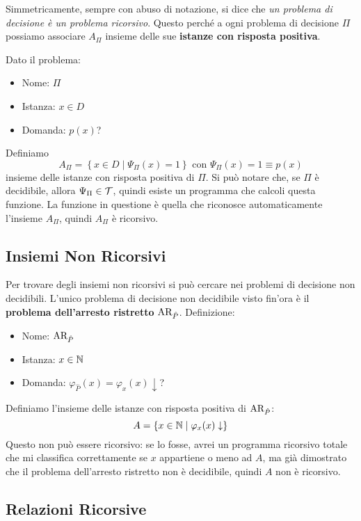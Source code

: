 Simmetricamente, sempre con abuso di notazione, si dice che \textit{un problema di decisione è un problema ricorsivo}. Questo perché a ogni problema di decisione $\Pi$ possiamo associare $A_\Pi$ insieme delle sue \textbf{istanze con risposta positiva}.

Dato il problema:
\begin{itemize}
	\item Nome: $\Pi$
    
	\item Istanza: $x \in D$
	
    \item Domanda: $p(x)$?
\end{itemize}

Definiamo
$$ A_\Pi = \left\{x \in D \mid \Psi_\Pi (x) = 1\right\} \text{ con } \Psi_\Pi (x) = 1 \equiv p(x) $$
insieme delle istanze con risposta positiva di $\Pi$. Si può notare che, se $\Pi$ è decidibile, allora $\Psi_\Pi \in \mathcal{T}$, quindi esiste un programma che calcoli questa funzione. La funzione in questione è quella che riconosce automaticamente l'insieme $A_\Pi$, quindi $A_\Pi$ è ricorsivo.

\subsection{Insiemi Non Ricorsivi}

Per trovare degli insiemi non ricorsivi si può cercare nei problemi di decisione non decidibili. L'unico problema di decisione non decidibile visto fin'ora è il \textbf{problema dell'arresto ristretto} $\text{AR}_{\hat{P}}$. Definizione:
\begin{itemize}
	\item Nome: $\text{AR}_{\hat{P}}$
    
	\item Istanza: $x \in \mathbb{N}$
	
    \item Domanda: $\varphi_{\hat{P}} (x) = \varphi_x (x) \downarrow$?
\end{itemize}

Definiamo l'insieme delle istanze con risposta positiva di $\text{AR}_{\hat{P}}$:
$$ A = \left\{ x \in \mathbb{N} \mid \varphi_x (x) \downarrow \right\}$$
Questo non può essere ricorsivo: se lo fosse, avrei un programma ricorsivo totale che mi classifica correttamente se $x$ appartiene o meno ad $A$, ma già dimostrato che il problema dell'arresto ristretto non è decidibile, quindi $A$ non è ricorsivo.

\subsection{Relazioni Ricorsive}

